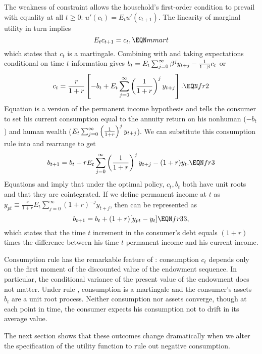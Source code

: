 The weakness of constraint
 allows the household's first-order
condition to prevail with equality at all $t \geq 0$:
$u'(c_t) = E_t u'(c_{t+1})$.  The linearity of
marginal utility in turn implies
$$ E_t c_{t+1} = c_t,   \EQN mmart $$
which states that $c_t$ is a martingale.
Combining  with  and taking
expectations  conditional on time $t$ information
gives
$ b_t = E_t \sum_{j=0}^\infty \beta^j y_{t+j}
  - {1 \over 1-\beta} c_t $
or
$$ c_t = {r \over 1+r} \left[-b_t +
E_t \sum_{j=0}^\infty \left({1 \over 1+r}\right)^j y_{t+j} \right].
\EQN fr2 $$
Equation   is a version of the permanent
income hypothesis and tells the consumer to set
his current consumption equal to the annuity return on his nonhuman ($-b_t$) and
human   wealth
($E_t \sum_{j=0}^\infty \left({1 \over 1+r}\right)^j y_{t+j}
$).   We can substitute this consumption
rule into  and rearrange to get
$$ b_{t+1} = b_t + r E_t \sum_{j=0}^\infty
  \left({1 \over 1+r}\right)^j y_{t+j}  -(1+r)y_t. \EQN fr3 $$
Equations  and   imply that
under the optimal  policy,
$c_t, b_t$ both have unit roots and that
they are cointegrated.
If we define permanent income at $t$ as
$ y_{pt} \equiv {\frac{r}{1+r}} E_t \sum_{j=0}^\infty (1+r)^{-j} y_{t+j}$, then 
can be represented as
$$
b_{t+1} = b_t + (1+r)[y_{pt} - y_t ] \EQN fr33, $$
which states that the time $t$ increment in the  consumer's debt equals $(1+r)$ times the difference between his time $t$ permanent income and his current income.


  Consumption rule  has the remarkable  feature
of :  consumption $c_t$ depends only
on the first moment of the discounted value of the endowment
sequence.  In particular, the conditional variance  of the present
value of the endowment does
not matter. Under rule ,
consumption is a martingale and the consumer's assets
$b_t$ are a unit root process.  Neither consumption nor
assets converge, though at each point in time, the consumer
expects his consumption not to drift in its average value.

The next section shows that
these outcomes  change dramatically when we alter
the specification of the utility function to rule out
negative consumption.

